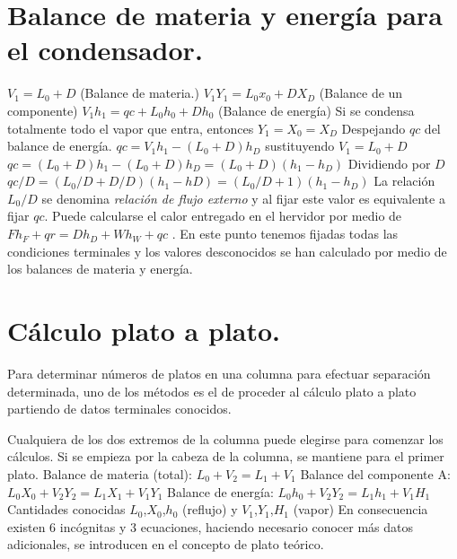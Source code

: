 \documentclass[11pt,openany]{book}
\begin{document}
\section{Balance de materia y energía para el condensador.}
$V_1 = L_0 + D$ (Balance de materia.)
\newline\newline
$V_1 Y_1= L_0 x_0 + D X_D$ (Balance de un componente)
\newline\newline
$V_1 h_1 = qc + L_0 h_0 + D h_0$ (Balance de energía)
\newline\newline
Si se condensa totalmente todo el vapor que entra, entonces
\newline\newline
$Y_1 = X_0 = X_D$
Despejando $qc$ del balance de energía.
$qc = V_1 h_1 - (L_0+D)h_D$
\newline\newline
sustituyendo $V_1=L_0 +D$
\newline\newline
$qc=(L_0+D)h_1 - (L_0+D)h_D = (L_0+D)(h_1-h_D)$
\newline\newline
Dividiendo por $D$
\newline\newline
$qc/D = (L_0/D + D/D)(h_1-hD)=(L_0/D +1)(h_1-h_D)$
\newline\newline
La relación $L_0/D$ se denomina \textit{relación de flujo externo} y al fijar este valor es equivalente a 
fijar $qc$. Puede calcularse el calor entregado en el hervidor por medio de 
$F h_F + qr = D h_D + W h_W + qc$ . En este punto tenemos fijadas todas las condiciones terminales y los valores 
desconocidos se han calculado por medio de los balances de materia y energía.
\section{Cálculo plato a plato.}
Para determinar números de platos en una columna para efectuar separación determinada, uno 
de los métodos es el de proceder al cálculo plato a plato partiendo de datos terminales conocidos.

Cualquiera de los dos extremos de la columna puede elegirse para comenzar los cálculos. Si se 
empieza por la cabeza de la columna, se mantiene para el primer plato.
\newline
Balance de materia (total): $L_0+V_2=L_1+V_1$
\newline \newline
Balance del componente A: $L_0 X_0 + V_2 Y_2 = L_1 X_1 + V_1 Y_1$
\newline \newline
Balance de energía: $L_0 h_0+V_2 Y_2=L_1 h_1+V_1 H_1$
\newline\newline
Cantidades conocidas $L_0$,$X_0$,$h_0$ (reflujo) y $V_1$,$Y_1$,$ H_1$ (vapor)
\newline\newline
En consecuencia existen 6 incógnitas y 3 ecuaciones, haciendo necesario conocer más datos 
adicionales, se introducen en el concepto de plato teórico.
\end{document}
